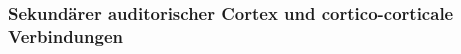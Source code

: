 \documentclass[12pt,a4paper,pdftex]{article}
\begin{document}

\subsubsection*{Sekundärer auditorischer Cortex und cortico-corticale Verbindungen}
\end{document}
